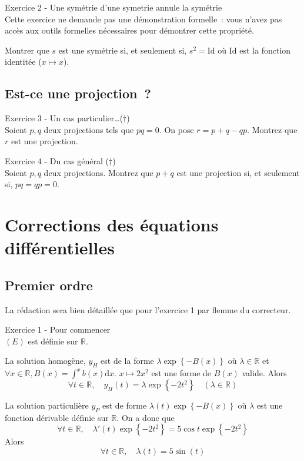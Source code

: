 \documentclass[a4paper, titlepage]{article}
\newenvironment{lititle}%
{\vspace{7mm}\LobsterTwo \large}%
{\\}
\begin{document}
	\begin{lititle}
		Exercice 2 - Une symétrie d'une symetrie annule la symétrie
	\end{lititle}
	Cette exercice ne demande pas une démonstration formelle~: vous n'avez pas accès aux outils formelles nécessaires pour démontrer cette propriété.

	Montrer que $s$ est une symétrie si, et seulement si, $s^2 = \mathrm{Id}$ où $\mathrm{Id}$ est la fonction identitée ($x\longmapsto x$).

	\subsection{Est-ce une projection~?}
	\begin{lititle}
		Exercice 3 - Un cas particulier\ldots ($\dagger$)
	\end{lititle}
	Soient $p,q$ deux projections tels que $pq = 0$. On pose $r = p + q - qp$. Montrez que $r$ est une projection.

	\begin{lititle}
		Exercice 4 - Du cas général ($\dagger$)
	\end{lititle}
	Soient $p,q$ deux projections. Montrez que $p+q$ est une projection si, et seulement si, $pq=qp=0$.
	\appendix
	\section{Corrections des équations différentielles}
	\subsection{Premier ordre}
	La rédaction sera bien détaillée que pour l'exercice 1 par flemme du correcteur.

	\begin{lititle}
		Exercice 1 - Pour commencer
	\end{lititle}
	$(E)$ est définie sur $\mathbb{R}$.

	La solution homogène, $y_H$ est de la forme $\lambda\exp\left\{ -B(x) \right\}$ où $\lambda\in\mathbb{R}$ et $\forall x\in\mathbb{R},B(x)=\int^x b(x)\mathrm{d}x$. $x\longmapsto 2x^2$ est une forme de $B(x)$ valide. Alors
	$$ \forall t\in\mathbb{R},\quad y_H(t) = \lambda\exp\left\{ -2t^2 \right\}\quad (\lambda\in\mathbb{R}) $$

	La solution particulière $y_P$ est de forme $\lambda(t)\exp\left\{ -B(x) \right\}$ où $\lambda$ est une fonction dérivable définie sur $\mathbb{R}$. On a donc que
	$$ \forall t\in\mathbb{R},\quad \lambda'(t)\exp\left\{ -2t^2 \right\} = 5\cos t\exp\left\{ -2t^2 \right\} $$
	Alors
	$$ \forall t\in\mathbb{R},\quad \lambda(t) = 5\sin(t) $$
\end{document}
